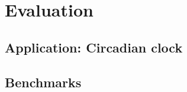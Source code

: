 \section{Evaluation}
\label{sec:evaluation}
\subsection{Application: Circadian clock}


\subsection{Benchmarks}
